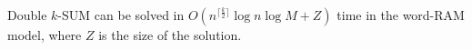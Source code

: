 \begin{lemma}\label{lem:double}
	Double $k$-SUM can be solved in $O(n^{\lceil \frac{k}{2}
	\rceil} \log n \log M + Z)$ time in the word-RAM model, where $Z$ is
	the size of the solution.
\end{lemma}
